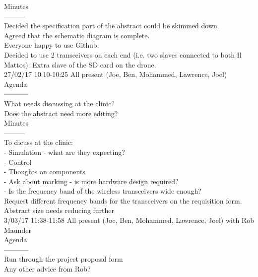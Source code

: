\documentclass[a4paper,11pt]{article}
\begin{document}
Minutes\\
---------\\
Decided the specification part of the abstract could be skimmed down.\\
Agreed that the schematic diagram is complete.\\
Everyone happy to use Github.\\
Decided to use 2 transceivers on each end (i.e. two slaves connected to both Il Mattos). Extra slave of the SD card on the drone.\\

27/02/17 10:10-10:25 All present (Joe, Ben, Mohammed, Lawrence, Joel)\\
Agenda\\
-----------\\
What needs discussing at the clinic?\\
Does the abstract need more editing?\\

Minutes\\
---------\\
To dicuss at the clinic:\\
	- Simulation - what are they expecting?\\
	- Control\\
	- Thoughts on components\\
	- Ask about marking - is more hardware design required?\\
	- Is the frequency band of the wireless transceivers wide enough?\\
Request different frequency bands for the transceivers on the requisition form.\\
Abstract size needs reducing further\\

3/03/17 11:38-11:58 All present (Joe, Ben, Mohammed, Lawrence, Joel) with Rob Maunder\\
Agenda\\
-----------\\
Run through the project proposal form\\
Any other advice from Rob?\\
\end{document}
